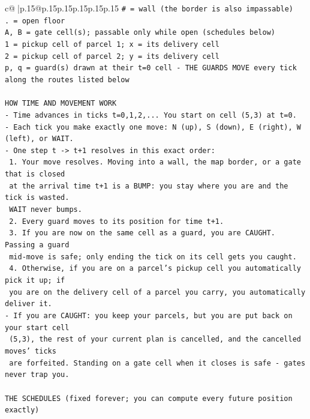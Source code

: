 \documentclass{article}
\begin{document}
{\begin{supertabular}{c@{$\;$}|p{.15\linewidth}@{}p{.15\linewidth}p{.15\linewidth}p{.15\linewidth}p{.15\linewidth}p{.15\linewidth}}
{{{\texttt{\# = wall (the border is also impassable)} \\
\texttt{. = open floor} \\
\texttt{A, B = gate cell(s); passable only while open (schedules below)} \\
\texttt{1 = pickup cell of parcel 1; x = its delivery cell} \\
\texttt{2 = pickup cell of parcel 2; y = its delivery cell} \\
\texttt{p, q = guard(s) drawn at their t=0 cell {-} THE GUARDS MOVE every tick along the routes listed below} \\
\\ 
\texttt{HOW TIME AND MOVEMENT WORK} \\
\texttt{{-} Time advances in ticks t=0,1,2,... You start on cell (5,3) at t=0.} \\
\texttt{{-} Each tick you make exactly one move: N (up), S (down), E (right), W (left), or WAIT.} \\
\texttt{{-} One step t {-}> t+1 resolves in this exact order:} \\
\texttt{  1. Your move resolves. Moving into a wall, the map border, or a gate that is closed} \\
\texttt{     at the arrival time t+1 is a BUMP: you stay where you are and the tick is wasted.} \\
\texttt{     WAIT never bumps.} \\
\texttt{  2. Every guard moves to its position for time t+1.} \\
\texttt{  3. If you are now on the same cell as a guard, you are CAUGHT. Passing a guard} \\
\texttt{     mid{-}move is safe; only ending the tick on its cell gets you caught.} \\
\texttt{  4. Otherwise, if you are on a parcel's pickup cell you automatically pick it up; if} \\
\texttt{     you are on the delivery cell of a parcel you carry, you automatically deliver it.} \\
\texttt{{-} If you are CAUGHT: you keep your parcels, but you are put back on your start cell} \\
\texttt{  (5,3), the rest of your current plan is cancelled, and the cancelled moves' ticks} \\
\texttt{  are forfeited. Standing on a gate cell when it closes is safe {-} gates never trap you.} \\
\\ 
\texttt{THE SCHEDULES (fixed forever; you can compute every future position exactly)} \\
}}}
\end{supertabular}}
\end{document}
